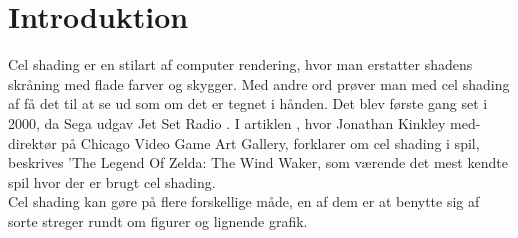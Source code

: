 \newpage
\section{Introduktion}
\setcounter{page}{1}
Cel shading er en stilart af computer rendering, hvor man erstatter shadens skråning med flade farver og skygger. Med andre ord prøver man med cel shading af få det til at se ud som om det er tegnet i hånden. Det blev første gang set i 2000, da Sega udgav Jet Set Radio \cite{tvtropes2016}.
I artiklen \cite{Kinkley2016}, hvor Jonathan Kinkley med-direktør på Chicago Video Game Art Gallery, forklarer om cel shading i spil, beskrives ’The Legend Of Zelda: The Wind Waker, som værende det mest kendte spil hvor der er brugt cel shading.
\\
Cel shading kan gøre på flere forskellige måde, en af dem er at benytte sig af sorte streger rundt om figurer og lignende grafik. 